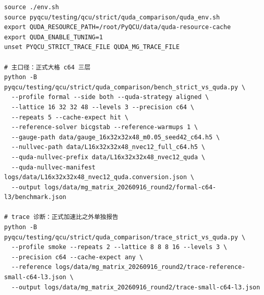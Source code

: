 \documentclass[UTF8,a4paper,11pt]{ctexart}
\begin{document}
\begin{verbatim}
source ./env.sh
source pyqcu/testing/qcu/strict/quda_comparison/quda_env.sh
export QUDA_RESOURCE_PATH=/root/PyQCU/data/quda-resource-cache
export QUDA_ENABLE_TUNING=1
unset PYQCU_STRICT_TRACE_FILE QUDA_MG_TRACE_FILE

# 主口径：正式大格 c64 三层
python -B pyqcu/testing/qcu/strict/quda_comparison/bench_strict_vs_quda.py \
  --profile formal --side both --quda-strategy aligned \
  --lattice 16 32 32 48 --levels 3 --precision c64 \
  --repeats 5 --cache-expect hit \
  --reference-solver bicgstab --reference-warmups 1 \
  --gauge-path data/gauge_16x32x32x48_m0.05_seed42_c64.h5 \
  --nullvec-path data/L16x32x32x48_nvec12_full_c64.h5 \
  --quda-nullvec-prefix data/L16x32x32x48_nvec12_quda \
  --quda-nullvec-manifest logs/data/L16x32x32x48_nvec12_quda.conversion.json \
  --output logs/data/mg_matrix_20260916_round2/formal-c64-l3/benchmark.json

# trace 诊断：正式加速比之外单独报告
python -B pyqcu/testing/qcu/strict/quda_comparison/trace_strict_vs_quda.py \
  --profile smoke --repeats 2 --lattice 8 8 8 16 --levels 3 \
  --precision c64 --cache-expect any \
  --reference logs/data/mg_matrix_20260916_round2/trace-reference-small-c64-l3.json \
  --output logs/data/mg_matrix_20260916_round2/trace-small-c64-l3.json
\end{verbatim}
\end{document}
